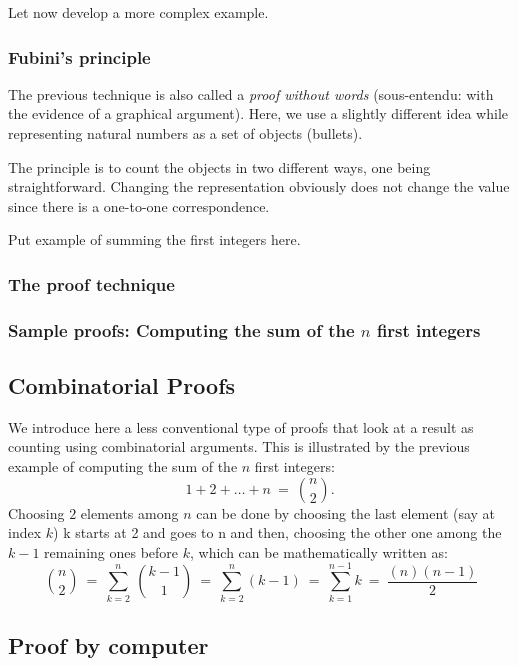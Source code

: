 Let now develop a more complex example.



\subsubsection{Fubini's principle}
\label{sec:Fubini}


The previous technique is also called a \textit{proof without words}
(sous-entendu: with the evidence of a graphical argument).
Here, we use a slightly different idea while representing natural numbers as a set of objects (bullets).

The principle is to count the objects in two different ways, one being straightforward.
Changing the representation obviously does not change the value
since there is a one-to-one correspondence.
\medskip

{\Denis Put example of summing the first integers here.}


\subsubsection{The proof technique}


\subsubsection{Sample proofs: Computing the sum of the $n$ first integers}




\subsection{Combinatorial Proofs}

We introduce here a less conventional type of proofs that look at a result
as counting using combinatorial arguments.
This is illustrated by the previous example of computing the sum of the $n$ first integers:
\[ 1+2+ \ldots + n \ = \ {n \choose 2}.  \]
Choosing $2$ elements among $n$ can be done by choosing the last element (say at index $k$)
{\Denis k starts at 2 and goes to n}
and then, choosing the other one among the $k-1$ remaining ones before $k$, 
which can be mathematically written as:
\[ \ {n \choose 2} \ = \  \sum_{k=2}^n  \ {k-1 \choose 1} \ = \  \sum_{k=2}^n  (k-1) \ = \  \sum_{k=1}^{n-1}  k \ = \ \frac{(n)(n-1)}{2}\]



\subsection{Proof by computer}

